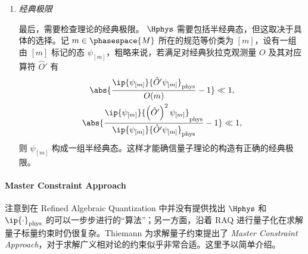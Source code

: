 \begin{enumerate}
				\item \emph{经典极限}
		
						最后，需要检查理论的经典极限。 $\Hphys$ 需要包括半经典态，但这取决于具体的选择。记 $m\in \phasespace{M}$ 所在的规范等价类为 $[m]$，设有一组 由 $[m]$ 标记的态 $\psi_{[m]}$，粗略来说，若满足对经典狄拉克观测量 $O$ 及其对应算符 $\hat{O}'$ 有
						\begin{gather}
							\abs{\frac{\ip{\psi_{[m]}}{\hat{O}^\prime \psi_{[m]}}_{\text{phys}}}{O(m)} - 1} \ll 1,\\
							\abs{\frac{\ip{\psi_{[m]}}{\left( \hat{O}^\prime \right)^2 \psi_{[m]}}_{\text{phys}}}{\ip{\psi_{[m]}}{\hat{O}^\prime \psi_{[m]}}_{\text{phys}}} - 1} \ll 1,
						\end{gather}
						则 $\psi_{[m]}$ 构成一组半经典态。这样才能确信量子理论的构造有正确的经典极限。
			\end{enumerate}

		\paragraph{Master Constraint Approach}
			注意到在 Refined Algebraic Quantization 中并没有提供找出 $\Hphys$ 和 $\ip{\cdot}_{\text{phys}}$ 的可以一步步进行的“算法”；另一方面，沿着 RAQ 进行量子化在求解量子标量约束时仍很复杂。Thiemann 为求解量子约束提出了 \emph{Master Constraint Approach}，对于求解广义相对论的约束似乎非常合适\cite{Thiemann2003zv}。这里予以简单介绍。


